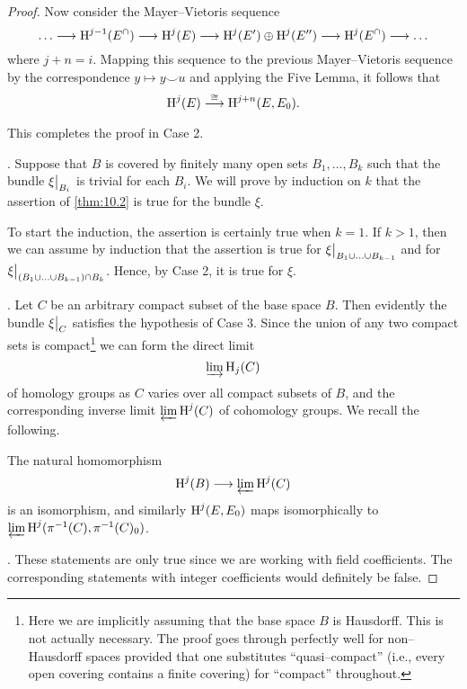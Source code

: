\documentclass[../main]{subfiles}
\begin{document}
\begin{proof}
Now consider the Mayer--Vietoris sequence \[\ldots \longrightarrow \operatorname{H}^{j - 1}(E^\cap) \longrightarrow \operatorname{H}^j(E) \longrightarrow \operatorname{H}^j(E') \oplus \operatorname{H}^j(E'') \longrightarrow \operatorname{H}^j(E^\cap) \longrightarrow \ldots\] where $j + n = i$. Mapping this sequence to the previous Mayer--Vietoris sequence by the correspondence $y \mapsto y \smile u$ and applying the Five Lemma, it follows that \[\homology^j(E) \varrightarrow{\cong} \homology^{j + n}(E, E_0).\] This completes the proof in Case 2. 

. Suppose that $B$ is covered by finitely many open sets $B_1, \ldots, B_k$ such that the bundle $\xi \big{|}_{B_i}$ is trivial for each $B_i$. We will prove by induction on $k$ that the assertion of \ref{thm:10.2} is true for the bundle $\xi$. 

To start the induction, the assertion is certainly true when $k = 1$. If $k > 1$, then we can assume by induction that the assertion is true for $\xi \big{|}_{B_1 \cup \ldots \cup B_{k - 1}}$ and for $\xi \big{|}_{(B_1 \cup \ldots \cup B_{k - 1}) \cap B_k}$. Hence, by Case 2, it is true for $\xi$. 

. Let $C$ be an arbitrary compact subset of the base space $B$. Then evidently the bundle $\xi \big{|}_C$ satisfies the hypothesis of Case 3. Since the union of any two compact sets is compact\footnote{Here we are implicitly assuming that the base space $B$ is Hausdorff. This is not actually necessary. The proof goes through perfectly well for non--Hausdorff spaces provided that one substitutes ``quasi--compact'' (i.e., every open covering contains a finite covering) for ``compact'' throughout.} we can form the direct limit \[\varinjlim \operatorname{H}_j(C)\] of homology groups as $C$ varies over all compact subsets of $B$, and the corresponding inverse limit $\varprojlim \operatorname{H}^j(C)$ of cohomology groups. We recall the following.

\begin{lemma}
\label{lem:10.3}
The natural homomorphism \[\operatorname{H}^j(B) \longrightarrow \varprojlim \operatorname{H}^j(C)\] is an isomorphism, and similarly $\operatorname{H}^j(E, E_0)$ maps isomorphically to\newline $\varprojlim \operatorname{H}^j(\pi^{-1}(C), \pi^{-1}(C)_0)$.
\end{lemma}

. These statements are only true since we are working with field coefficients. The corresponding statements with integer coefficients would definitely be false.


\end{proof}
\end{document}
